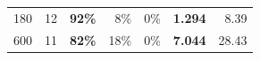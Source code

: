\documentclass{article}
\begin{document}
\begin{table}[!htbp]
\begin{tabular}{@{}rrrrrrr@{}}
180
& 12
& \cellcolor{tabGain}\textbf{92\%}
& 8\%
& 0\%
& \cellcolor{tabGain}\textbf{1.294}
& 8.39 \\

600
& 11
& \cellcolor{tabGain}\textbf{82\%}
& 18\%
& 0\%
& \cellcolor{tabGain}\textbf{7.044}
& 28.43 \\

\bottomrule
\end{tabular}
\endgroup

\end{table}
\end{document}
